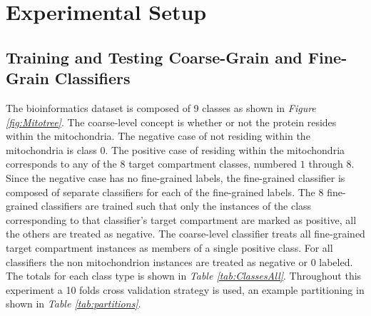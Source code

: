 \documentclass[ms]{nuthesis}
\begin{document}
\chapter{Experimental Setup}
\section{Training and Testing Coarse-Grain and Fine-Grain Classifiers}
\par The bioinformatics dataset is composed of 9 classes as shown in
\textit{Figure \ref{fig:Mitotree}}. The coarse-level concept is whether or not
the protein resides within the mitochondria. The negative case of not residing within the mitochondria is class $0$.
The positive case of residing within the
  mitochondria corresponds to any of the $8$ target compartment classes,  numbered $1$ through $8$. Since the
  negative case has no fine-grained labels, the fine-grained classifier is composed of separate classifiers
  for each of the fine-grained labels. The $8$ fine-grained classifiers are trained such that only the instances of
  the class corresponding to that classifier's target compartment are marked as positive, all the others are treated
  as negative. The coarse-level classifier treats all fine-grained target compartment
  instances as members of a single positive class. For all classifiers the non mitochondrion instances are treated as
  negative or $0$ labeled. The totals for each class type is shown in \textit{Table \ref{tab:ClassesAll}}. Throughout
  this experiment a 10 folds cross validation strategy is used, an example partitioning in shown in
  \textit{Table \ref{tab:partitions}}.
\end{document}
